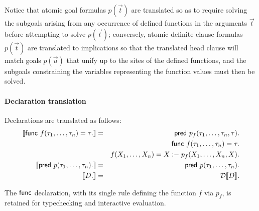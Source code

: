 \documentclass[draft,12pt]{report}
\newcommand{\ent}{\mathrel{{:}{-}}}
\begin{document}
Notice that atomic goal formulas $p(\vec{t})$ are translated so as to require
solving the subgoals arising from any occurrence of defined functions
in the arguments $\vec{t}$ before attempting to solve $p(\vec{t})$;
conversely, atomic definite clause formulas $p(\vec{t})$ are translated
to implications so that the translated head clause will match goals
$p(\vec{u})$ that unify up to the sites of the defined functions, and
the subgoals constraining the variables representing the function
values must then be solved.

\paragraph{Declaration translation}
Declarations are translated as follows:
\begin{eqnarray*}
\declflat{\func~f(\tau_1,\ldots,\tau_n) = \tau.} &=&
\pred~p_f(\tau_1,\ldots,\tau_n,\tau).\\
&& \func~f(\tau_1,\ldots,\tau_n) = \tau.\\
&& f(X_1,\ldots,X_n) = X \ent p_f(X_1,\ldots,X_n,X).\\
\declflat{\pred~p(\tau_1,\ldots,\tau_n).} &=&
\pred~p(\tau_1,\ldots,\tau_n).\\
\declflat{D.} &=& \dflat{D}.
\end{eqnarray*}

The $\mathsf{func}$ declaration, with its single rule defining the function $f$
via $p_f$, is retained for typechecking and interactive evaluation.
\end{document}

